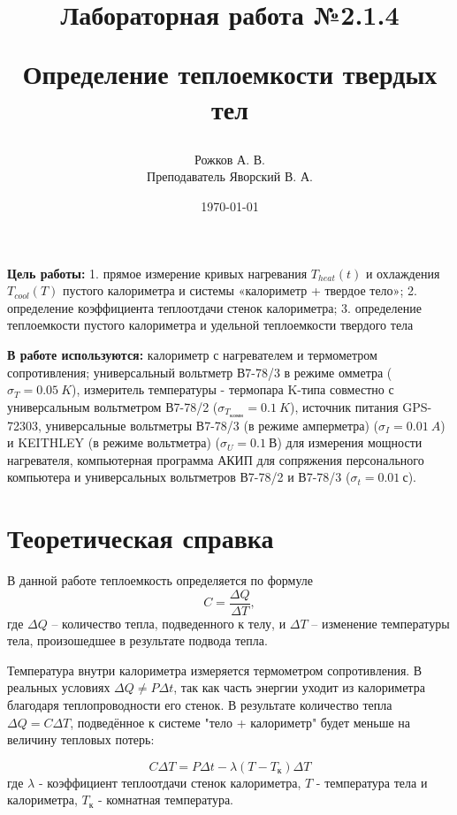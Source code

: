 \documentclass[a4paper, 12pt]{article}
\title{\begin{center}Лабораторная работа №2.1.4\end{center}
Определение теплоемкости твердых тел}
\author{Рожков А. В. \\ Преподаватель Яворский В. А.}
\date{\today}
\begin{document}
    \maketitle
    \newpage

    \textbf{Цель работы:} 1. прямое измерение кривых нагревания $T_{heat}(t)$ и охлаждения $T_{cool}(T)$ пустого калориметра и системы «калориметр + твердое тело»; 2. определение коэффициента теплоотдачи стенок калориметра; 3. определение теплоемкости пустого калориметра и удельной теплоемкости твердого тела

	\textbf{В работе используются:} калориметр с нагревателем и термометром сопротивления; универсальный вольтметр В7-78/3 в режиме омметра ($\sigma_{T} = 0.05~K$), измеритель температуры - термопара K-типа совместно с универсальным вольтметром В7-78/2 ($\sigma_{T_{комн}} = 0.1~K$), источник питания GPS-72303, универсальные вольтметры В7-78/3 (в режиме амперметра) ($\sigma_I = 0.01~A$) и KEITHLEY (в режиме вольтметра) ($\sigma_U = 0.1~В$) для измерения мощности нагревателя, компьютерная программа АКИП для сопряжения персонального компьютера и универсальных вольтметров В7-78/2 и В7-78/3 ($\sigma_t = 0.01~с$).

    \section{Теоретическая справка}

        В данной работе теплоемкость определяется по формуле
        \begin{equation}
            C = \frac{\Delta Q}{\Delta T},
            \label{eq:dQdT}
        \end{equation}
        где $\Delta Q$ -- количество тепла, подведенного к телу, и $\Delta T$ -- изменение температуры тела, произошедшее в результате подвода тепла.

        Температура внутри калориметра измеряется термометром сопротивления. В реальных условиях $\Delta Q \neq P \Delta t$, так как часть энергии уходит из калориметра благодаря теплопроводности его стенок. В результате количество тепла $\Delta Q = C \Delta T$, подведённое к системе "тело + калориметр" будет меньше на величину тепловых потерь:

        \begin{equation}
            C \Delta T = P \Delta t - \lambda(T - T_к) \Delta T
            \label{eq:C_Delta_T}
        \end{equation}
        где $\lambda$ - коэффициент теплоотдачи стенок калориметра, $T$ - температура тела и калориметра, $T_к$ - комнатная температура.
\end{document}
